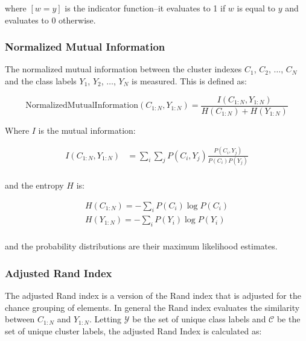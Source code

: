 \documentclass[11pt]{article}
\begin{document}
where $[w=y]$ is the indicator function--it evaluates to 1 if $w$ is equal to $y$ and evaluates to 0 otherwise. 

\subsubsection{Normalized Mutual Information}

The normalized mutual information between the cluster indexes $C_1$, $C_2$, $\dots$, $C_N$ and the class labels  $Y_1$, $Y_2$, $\dots$, $Y_N$ is measured. This is defined as:

\begin{equation}
\text{NormalizedMutualInformation}(C_{1:N}, Y_{1:N}) = \frac{I(C_{1:N}, Y_{1:N}) }{H(C_{1:N}) + H(Y_{1:N}) }
\end{equation}

Where $I$ is the mutual information:

\begin{align}
I(C_{1:N}, Y_{1:N}) &= \sum_i \sum_j {P(C_i, Y_j)} \frac{P(C_i, Y_j)}{P(C_i)P(Y_j)} \\
\end{align}

and the entropy $H$ is:

\begin{align}
H(C_{1:N}) = - \sum_i P(C_i) \log P(C_i) \\
H(Y_{1:N}) = - \sum_i P(Y_i) \log P(Y_i) \\
\end{align}

and the probability distributions are their maximum likelihood estimates. 

\subsubsection{Adjusted Rand Index}

The adjusted Rand index is a version of the Rand index that is adjusted for the chance grouping of elements. In general the Rand index evaluates the similarity between $C_{1:N}$ and $Y_{1:N}$. Letting $\mathcal{Y}$ be the set of unique class labels and $\mathcal{C}$ be the set of unique cluster labels, the adjusted Rand Index is calculated as:

%
%
\end{document}
